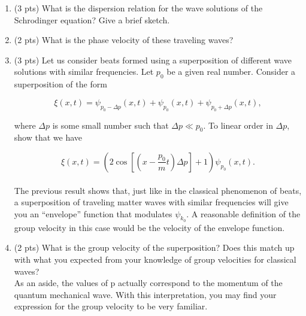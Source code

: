 \begin{enumerate}[label=\alph*)]
\item (3 pts) What is the dispersion relation for the wave solutions of the Schrodinger equation? Give a brief sketch.


\item (2 pts) What is the phase velocity of these traveling waves?

\item (3 pts) Let us consider beats formed using a superposition of different wave solutions with similar frequencies. Let $p_{0}$ be a given real number. Consider a superposition of the form

$$\xi(x,t)=\psi_{p_{0}-\Delta p}(x,t)+\psi_{p_{0}}(x,t)+\psi_{p_{0}+\Delta p}(x,t),$$

where $\Delta p$ is some small number such that $\Delta p\ll p_{0}$. To linear order in $\Delta p$, show that we have

$$\xi(x,t)=\left(2\cos\left[\left(x-\frac{p_{0}}{m}t\right)\Delta p\right]+1\right)\psi_{p_{0}}(x,t).$$
\\

The previous result shows that, just like in the classical phenomenon of beats, a superposition of traveling matter waves with similar frequencies will give you an “envelope” function that modulates $\psi_{k_{0}}$. A reasonable definition of the group velocity in this case would be the velocity of the envelope function.


\item (2 pts) What is the group velocity of the superposition? Does this match up with what you expected from your knowledge of group velocities for classical waves?
\\

As an aside, the values of p actually correspond to the momentum of the quantum mechanical wave. With this interpretation, you may find your expression for the group velocity to be very familiar.

%
%
\end{enumerate}

%
